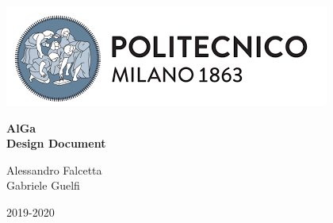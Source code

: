 \author{Alessandro Falcetta \and Federico Galati \and Gabriele Guelfi}

\begin{titlepage}

\includegraphics[width=\linewidth]{Pics/Polimi}
\begin{center}

	\vspace*{3cm}
	
	\Huge \textbf{AlGa\\} \vspace*{1cm}
	\LARGE \textbf{Design Document} \vspace*{3cm}

	
	\LARGE Alessandro Falcetta\\Gabriele Guelfi \vspace*{3cm}
	
	2019-2020
	
\end{center}

\end{titlepage}
